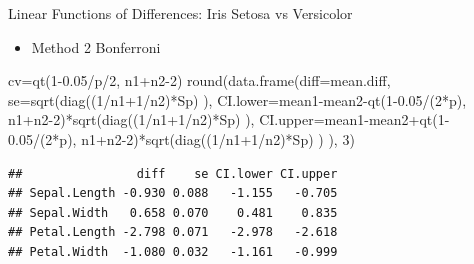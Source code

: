 \documentclass[
  ignorenonframetext,
]{beamer}
\newenvironment{Shaded}{\begin{snugshade}}{\end{snugshade}}
\newcommand{\AttributeTok}[1]{\textcolor[rgb]{0.77,0.63,0.00}{#1}}
\newcommand{\DecValTok}[1]{\textcolor[rgb]{0.00,0.00,0.81}{#1}}
\newcommand{\FloatTok}[1]{\textcolor[rgb]{0.00,0.00,0.81}{#1}}
\newcommand{\FunctionTok}[1]{\textcolor[rgb]{0.00,0.00,0.00}{#1}}
\newcommand{\NormalTok}[1]{#1}
\newcommand{\OtherTok}[1]{\textcolor[rgb]{0.56,0.35,0.01}{#1}}
\newcommand{\SpecialCharTok}[1]{\textcolor[rgb]{0.00,0.00,0.00}{#1}}
\providecommand{\tightlist}{%
  \setlength{\itemsep}{0pt}\setlength{\parskip}{0pt}}
\begin{document}
\begin{frame}[fragile]{Linear Functions of Differences: Iris Setosa vs
Versicolor}
\protect\hypertarget{linear-functions-of-differences-iris-setosa-vs-versicolor-3}{}
\begin{itemize}
\tightlist
\item
  Method 2 Bonferroni
\end{itemize}

\tiny

\begin{Shaded}
\begin{Highlighting}[]
\NormalTok{cv}\OtherTok{=}\FunctionTok{qt}\NormalTok{(}\DecValTok{1}\FloatTok{{-}0.05}\SpecialCharTok{/}\NormalTok{p}\SpecialCharTok{/}\DecValTok{2}\NormalTok{, n1}\SpecialCharTok{+}\NormalTok{n2}\DecValTok{{-}2}\NormalTok{)}
\FunctionTok{round}\NormalTok{(}\FunctionTok{data.frame}\NormalTok{(}\AttributeTok{diff=}\NormalTok{mean.diff, }\AttributeTok{se=}\FunctionTok{sqrt}\NormalTok{(}\FunctionTok{diag}\NormalTok{((}\DecValTok{1}\SpecialCharTok{/}\NormalTok{n1}\SpecialCharTok{+}\DecValTok{1}\SpecialCharTok{/}\NormalTok{n2)}\SpecialCharTok{*}\NormalTok{Sp) ),}
\AttributeTok{CI.lower=}\NormalTok{mean1}\SpecialCharTok{{-}}\NormalTok{mean2}\SpecialCharTok{{-}}\FunctionTok{qt}\NormalTok{(}\DecValTok{1}\FloatTok{{-}0.05}\SpecialCharTok{/}\NormalTok{(}\DecValTok{2}\SpecialCharTok{*}\NormalTok{p), n1}\SpecialCharTok{+}\NormalTok{n2}\DecValTok{{-}2}\NormalTok{)}\SpecialCharTok{*}\FunctionTok{sqrt}\NormalTok{(}\FunctionTok{diag}\NormalTok{((}\DecValTok{1}\SpecialCharTok{/}\NormalTok{n1}\SpecialCharTok{+}\DecValTok{1}\SpecialCharTok{/}\NormalTok{n2)}\SpecialCharTok{*}\NormalTok{Sp) ),}
\AttributeTok{CI.upper=}\NormalTok{mean1}\SpecialCharTok{{-}}\NormalTok{mean2}\SpecialCharTok{+}\FunctionTok{qt}\NormalTok{(}\DecValTok{1}\FloatTok{{-}0.05}\SpecialCharTok{/}\NormalTok{(}\DecValTok{2}\SpecialCharTok{*}\NormalTok{p), n1}\SpecialCharTok{+}\NormalTok{n2}\DecValTok{{-}2}\NormalTok{)}\SpecialCharTok{*}\FunctionTok{sqrt}\NormalTok{(}\FunctionTok{diag}\NormalTok{((}\DecValTok{1}\SpecialCharTok{/}\NormalTok{n1}\SpecialCharTok{+}\DecValTok{1}\SpecialCharTok{/}\NormalTok{n2)}\SpecialCharTok{*}\NormalTok{Sp) ) ), }\DecValTok{3}\NormalTok{)}
\end{Highlighting}
\end{Shaded}

\begin{verbatim}
##                diff    se CI.lower CI.upper
## Sepal.Length -0.930 0.088   -1.155   -0.705
## Sepal.Width   0.658 0.070    0.481    0.835
## Petal.Length -2.798 0.071   -2.978   -2.618
## Petal.Width  -1.080 0.032   -1.161   -0.999
\end{verbatim}

\normalsize
\end{frame}
\end{document}
